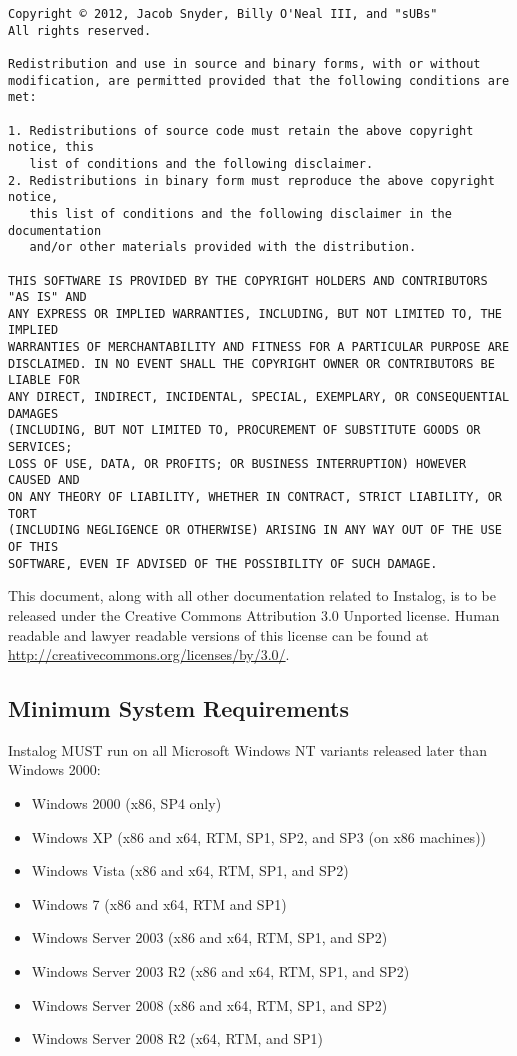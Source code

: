 \begin{verbatim}
Copyright © 2012, Jacob Snyder, Billy O'Neal III, and "sUBs"
All rights reserved.

Redistribution and use in source and binary forms, with or without
modification, are permitted provided that the following conditions are met: 

1. Redistributions of source code must retain the above copyright notice, this
   list of conditions and the following disclaimer. 
2. Redistributions in binary form must reproduce the above copyright notice,
   this list of conditions and the following disclaimer in the documentation
   and/or other materials provided with the distribution. 

THIS SOFTWARE IS PROVIDED BY THE COPYRIGHT HOLDERS AND CONTRIBUTORS "AS IS" AND
ANY EXPRESS OR IMPLIED WARRANTIES, INCLUDING, BUT NOT LIMITED TO, THE IMPLIED
WARRANTIES OF MERCHANTABILITY AND FITNESS FOR A PARTICULAR PURPOSE ARE
DISCLAIMED. IN NO EVENT SHALL THE COPYRIGHT OWNER OR CONTRIBUTORS BE LIABLE FOR
ANY DIRECT, INDIRECT, INCIDENTAL, SPECIAL, EXEMPLARY, OR CONSEQUENTIAL DAMAGES
(INCLUDING, BUT NOT LIMITED TO, PROCUREMENT OF SUBSTITUTE GOODS OR SERVICES;
LOSS OF USE, DATA, OR PROFITS; OR BUSINESS INTERRUPTION) HOWEVER CAUSED AND
ON ANY THEORY OF LIABILITY, WHETHER IN CONTRACT, STRICT LIABILITY, OR TORT
(INCLUDING NEGLIGENCE OR OTHERWISE) ARISING IN ANY WAY OUT OF THE USE OF THIS
SOFTWARE, EVEN IF ADVISED OF THE POSSIBILITY OF SUCH DAMAGE.
\end{verbatim}

This document, along with all other documentation related to Instalog,  is to be
released under the Creative Commons Attribution 3.0 Unported license. Human
readable and lawyer readable versions of this license can be found at
\url{http://creativecommons.org/licenses/by/3.0/}.

\subsection{Minimum System Requirements}
Instalog MUST run on all Microsoft Windows NT variants released later than
Windows 2000:
\begin{itemize}
  \item Windows 2000 (x86, SP4 only)
  \item Windows XP (x86 and x64, RTM, SP1, SP2, and SP3 (on x86 machines))
  \item Windows Vista (x86 and x64, RTM, SP1, and SP2)
  \item Windows 7 (x86 and x64, RTM and SP1)
  \item Windows Server 2003 (x86 and x64, RTM, SP1, and SP2)
  \item Windows Server 2003 R2 (x86 and x64, RTM, SP1, and SP2)
  \item Windows Server 2008 (x86 and x64, RTM, SP1, and SP2)
  \item Windows Server 2008 R2 (x64, RTM, and SP1)
\end{itemize}

